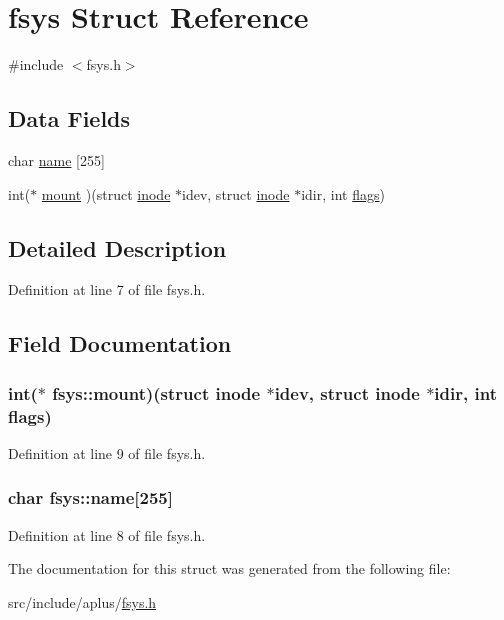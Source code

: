 \hypertarget{structfsys}{\section{fsys Struct Reference}
\label{structfsys}
}


{\ttfamily \#include $<$fsys.\+h$>$}

\subsection*{Data Fields}
\begin{DoxyCompactItemize}
\item 
char \hyperlink{structfsys_a8c3f03ed1ac90dac03da844178857891}{name} \mbox{[}255\mbox{]}
\item 
int($\ast$ \hyperlink{structfsys_ae6e5dcfb76d76f9636b95525ac63f4cb}{mount} )(struct \hyperlink{structinode}{inode} $\ast$idev, struct \hyperlink{structinode}{inode} $\ast$idir, int \hyperlink{iso9660_8h_aa2585d779da0ab21273a8d92de9a0ebe}{flags})
\end{DoxyCompactItemize}


\subsection{Detailed Description}


Definition at line 7 of file fsys.\+h.



\subsection{Field Documentation}
\hypertarget{structfsys_ae6e5dcfb76d76f9636b95525ac63f4cb}{
\subsubsection[{mount}]{\setlength{\rightskip}{0pt plus 5cm}int($\ast$ fsys\+::mount)(struct {\bf inode} $\ast$idev, struct {\bf inode} $\ast$idir, int {\bf flags})}}\label{structfsys_ae6e5dcfb76d76f9636b95525ac63f4cb}


Definition at line 9 of file fsys.\+h.

\hypertarget{structfsys_a8c3f03ed1ac90dac03da844178857891}{
\subsubsection[{name}]{\setlength{\rightskip}{0pt plus 5cm}char fsys\+::name\mbox{[}255\mbox{]}}}\label{structfsys_a8c3f03ed1ac90dac03da844178857891}


Definition at line 8 of file fsys.\+h.



The documentation for this struct was generated from the following file\+:\begin{DoxyCompactItemize}
\item 
src/include/aplus/\hyperlink{fsys_8h}{fsys.\+h}\end{DoxyCompactItemize}
